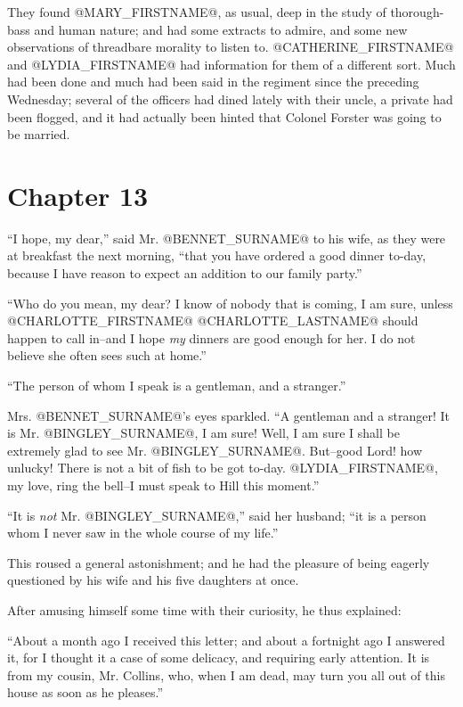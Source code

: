 They found @MARY_FIRSTNAME@, as usual, deep in the study of thorough-bass and human
nature; and had some extracts to admire, and some new observations of
threadbare morality to listen to. @CATHERINE_FIRSTNAME@ and @LYDIA_FIRSTNAME@ had information
for them of a different sort. Much had been done and much had been said
in the regiment since the preceding Wednesday; several of the officers
had dined lately with their uncle, a private had been flogged, and it
had actually been hinted that Colonel Forster was going to be married.



\chapter*{Chapter 13}


``I hope, my dear,'' said Mr. @BENNET_SURNAME@ to his wife, as they were at
breakfast the next morning, ``that you have ordered a good dinner to-day,
because I have reason to expect an addition to our family party.''

``Who do you mean, my dear? I know of nobody that is coming, I am sure,
unless @CHARLOTTE_FIRSTNAME@ @CHARLOTTE_LASTNAME@ should happen to call in--and I hope \textit{my} dinners
are good enough for her. I do not believe she often sees such at home.''

``The person of whom I speak is a gentleman, and a stranger.''

Mrs. @BENNET_SURNAME@'s eyes sparkled. ``A gentleman and a stranger! It is Mr.
@BINGLEY_SURNAME@, I am sure! Well, I am sure I shall be extremely glad to see Mr.
@BINGLEY_SURNAME@. But--good Lord! how unlucky! There is not a bit of fish to be
got to-day. @LYDIA_FIRSTNAME@, my love, ring the bell--I must speak to Hill this
moment.''

``It is \textit{not} Mr. @BINGLEY_SURNAME@,'' said her husband; ``it is a person whom I
never saw in the whole course of my life.''

This roused a general astonishment; and he had the pleasure of being
eagerly questioned by his wife and his five daughters at once.

After amusing himself some time with their curiosity, he thus explained:

``About a month ago I received this letter; and about a fortnight ago
I answered it, for I thought it a case of some delicacy, and requiring
early attention. It is from my cousin, Mr. Collins, who, when I am dead,
may turn you all out of this house as soon as he pleases.''

